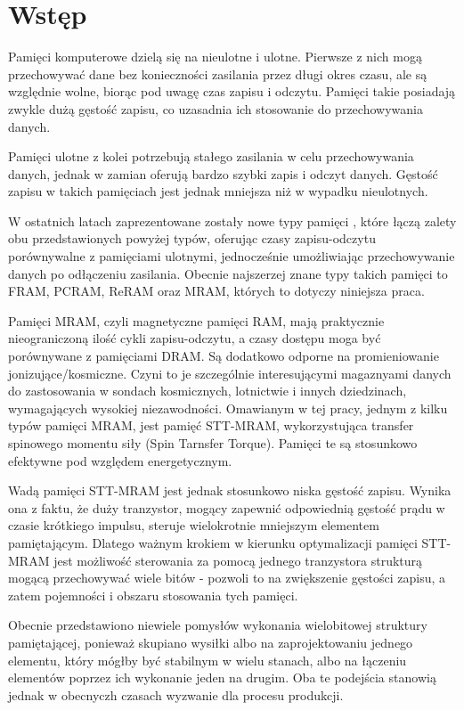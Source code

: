 \chapter{Wstęp}
	Pamięci komputerowe dzielą się na nieulotne i ulotne. Pierwsze z nich mogą przechowywać dane bez konieczności zasilania przez długi okres czasu, ale są względnie wolne, biorąc pod uwagę czas zapisu i odczytu. Pamięci takie posiadają zwykle dużą gęstość zapisu, co uzasadnia ich stosowanie do przechowywania danych.
	
	Pamięci ulotne z kolei potrzebują stałego zasilania w celu przechowywania danych, jednak w zamian oferują bardzo szybki zapis i odczyt danych. Gęstość zapisu w takich pamięciach jest jednak mniejsza niż w wypadku nieulotnych.

	W ostatnich latach zaprezentowane zostały nowe typy pamięci \cite{fujisaki2013review,kent2015new}, które łączą zalety obu przedstawionych powyżej typów, oferując czasy zapisu-odczytu porównywalne z pamięciami ulotnymi, jednocześnie umożliwiając przechowywanie danych po odłączeniu zasilania. Obecnie najszerzej znane typy takich pamięci to FRAM, PCRAM, ReRAM oraz MRAM, których to dotyczy niniejsza praca.
    
    Pamięci MRAM, czyli magnetyczne pamięci RAM, mają praktycznie nieograniczoną ilość cykli zapisu-odczytu, a czasy dostępu moga być porównywane z pamięciami DRAM. Są dodatkowo odporne na promieniowanie jonizujące/kosmiczne. Czyni to je szczególnie interesującymi magaznyami danych do zastosowania w sondach kosmicznych, lotnictwie i innych dziedzinach, wymagających wysokiej niezawodności. Omawianym w tej pracy, jednym z kilku typów pamięci MRAM, jest pamięć STT-MRAM, wykorzystująca transfer spinowego momentu siły (Spin Tarnsfer Torque). Pamięci te są stosunkowo efektywne pod względem energetycznym.
    
    Wadą pamięci STT-MRAM jest jednak stosunkowo niska gęstość zapisu. Wynika ona z faktu, że duży tranzystor, mogący zapewnić odpowiednią gęstość prądu w czasie krótkiego impulsu, steruje wielokrotnie mniejszym elementem pamiętającym. Dlatego ważnym krokiem w kierunku optymalizacji pamięci STT-MRAM jest możliwość sterowania za pomocą jednego tranzystora strukturą mogącą przechowywać wiele bitów - pozwoli to na zwiększenie gęstości zapisu, a zatem pojemności i obszaru stosowania tych pamięci.
    
    Obecnie przedstawiono niewiele pomysłów wykonania wielobitowej struktury pamiętającej, ponieważ skupiano wysiłki albo na zaprojektowaniu jednego elementu, który mógłby być stabilnym w wielu stanach, albo na łączeniu elementów poprzez ich wykonanie jeden na drugim. Oba te podejścia stanowią jednak w obecnyczh czasach wyzwanie dla procesu produkcji.
    
